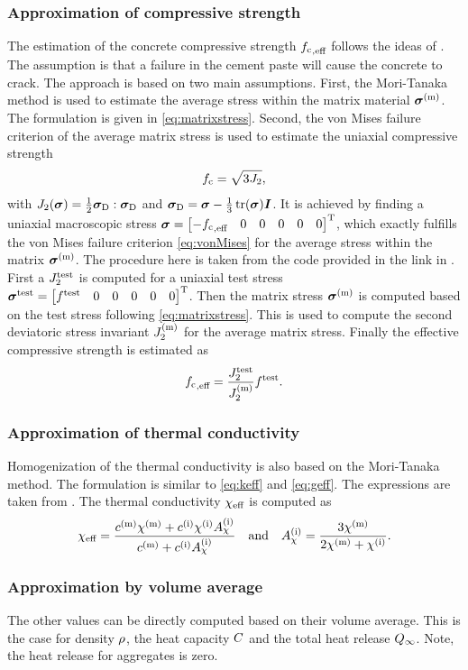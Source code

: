\subsubsection{Approximation of compressive strength}
The estimation of the concrete compressive strength ${f_{\text{c}}}_{,\text{eff}}$ follows the ideas of \cite{nev_2018_mcam}.
The assumption is that a failure in the cement paste will cause the concrete to crack.
The approach is based on two main assumptions.
First, the Mori-Tanaka method is used to estimate the average stress within the matrix material $\boldsymbol{\sigma}^{(\text{m})}$. 
The formulation is given in \eqref{eq:matrixstress}.
Second, the von Mises failure criterion of the average matrix stress is used to estimate the uniaxial compressive strength
\begin{align}
	{f_{\text{c}}} = \sqrt{3 J_2},  \label{eq:vonMises}
\end{align}
with $J_2(\boldsymbol{\sigma}) = \frac{1}{2} \boldsymbol{\sigma}_{\text{D}}:\boldsymbol{\sigma}_{\text{D}}$ and $\boldsymbol{\sigma}_{\text{D}} = \boldsymbol{\sigma} - \frac{1}{3}\operatorname{tr}(\boldsymbol{\sigma})\boldsymbol{I}$.
It is achieved by finding a uniaxial macroscopic stress $\boldsymbol{\sigma} = \begin{bmatrix} -{f_{\text{c}}}_{,\text{eff}} & 0 & 0 &0&0&0 \end{bmatrix}^\text{T}$, which exactly fulfills the von Mises failure criterion \eqref{eq:vonMises} for the average stress within the matrix $\boldsymbol{\sigma}^{(\text{m})}$.
The procedure here is taken from the code provided in the link in \cite{nee_2012_ammf}.
First a $J_2^{\text{test}}$ is computed for a uniaxial test stress $\boldsymbol{\sigma}^{\text{test}} = \begin{bmatrix} f^{\text{test}} & 0 & 0 &0&0&0 \end{bmatrix}^\text{T}$. 
Then the matrix stress $\boldsymbol{\sigma}^{(\text{m})}$ is computed based on the test stress following \eqref{eq:matrixstress}. 
This is used to compute the second deviatoric stress invariant $J_2^{(\text{m})}$ for the average matrix stress.
Finally the effective compressive strength is estimated as
\begin{align}
	{f_{\text{c}}}_{,\text{eff}} = \frac{J_2^{\text{test}}}{J_2^{(\text{m})}} f^{\text{test}}.
\end{align}
\subsubsection{Approximation of thermal conductivity }
Homogenization of the thermal conductivity is also based on the Mori-Tanaka method.
The formulation is similar to \eqref{eq:keff} and \eqref{eq:geff}.
The expressions are taken from \cite{str_2011_mbeo}.
The thermal conductivity $\chi_{\text{eff}}$ is computed as
\begin{align}
	\chi_{\text{eff}} = \dfrac{c^{(\text{m})}\chi^{(\text{m})} + c^{(\text{i})} \chi^{(\text{i})} A_{\chi}^{(\text{i})}}{c^{(\text{m})} +  c^{(\text{i})} A_{\chi}^{(\text{i})}}\quad\text{and}\quad
	A_{\chi}^{(\text{i})} = \frac{3\chi^{(\text{m})}}{2\chi^{(\text{m})}+\chi^{(\text{i})}}.
\end{align}
\subsubsection{Approximation by volume average}
The other values can be directly computed based on their volume average.
This is the case for density $\rho$, the heat capacity $C$ and the total heat release $Q_{\infty}$.
Note, the heat release for aggregates is zero.
